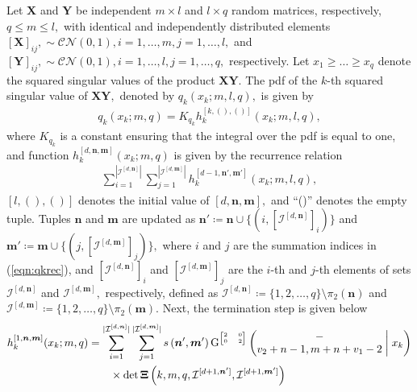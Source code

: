 \begin{theorem}
	\label{thm:qk}
	Let $\boldsymbol{X}$ and $\boldsymbol{Y}$ be independent $m\times l$ and $l\times q$ random matrices, respectively, $q \leq m \leq l,$ with identical and independently distributed elements $[\boldsymbol{X}]_{ij}, \sim \mathcal{CN}(0,1), i=1,\dots,m,j=1,\dots,l,$ and $[\boldsymbol{Y}]_{ij}, \sim \mathcal{CN}(0,1), i=1,\dots,l,j=1,\dots,q,$ respectively. Let $x_1 \geq \dots \geq x_q$ denote the squared singular values of the product $\boldsymbol{X}\boldsymbol{Y}.$ The pdf of the $k$-th squared singular value of $\boldsymbol{X}\boldsymbol{Y},$ denoted by $q_k(x_k; m, l, q),$ is given by
	\begin{align}
		q_k(x_k; m, q) = K_{q_k} h^{[k,(),()]}_k(x_k; m, l, q),
	\end{align}
	where $K_{q_k}$ is a constant ensuring that the integral over the pdf is equal to one, and function $h^{[d,\boldsymbol{n},\boldsymbol{m}]}_k(x_k; m, q)$ is given by the recurrence relation
	\begin{align}
		\sum_{i = 1}^{|{\mathcal{I}}^{[d,\boldsymbol{n}]}|} \sum_{j = 1}^{|{\mathcal{I}}^{[d,\boldsymbol{m}]}|} h^{[d-1,\boldsymbol{n}',\boldsymbol{m}']}_k(x_k; m,l,q), \label{eqn:qkrec}
	\end{align}
	$[l,(),()]$ denotes the initial value of $[d,\boldsymbol{n},\boldsymbol{m}],$ and ``()'' denotes the empty tuple. Tuples $\boldsymbol{n}$ and $\boldsymbol{m}$ are updated as $\boldsymbol{n}' \coloneqq \boldsymbol{n} \cup \{(i,[{\mathcal{I}}^{[d,\boldsymbol{n}]}]_i)\}$ and $\boldsymbol{m}' \coloneqq \boldsymbol{m} \cup \{(j,[{\mathcal{I}}^{[d,\boldsymbol{m}]}]_j)\},$ where $i$ and $j$ are the summation indices in (\ref{eqn:qkrec}), and $[{\mathcal{I}}^{[d,\boldsymbol{n}]}]_i$ and $[{\mathcal{I}}^{[d,\boldsymbol{m}]}]_j$ are the $i$-th and $j$-th elements of sets ${\mathcal{I}}^{[d, \boldsymbol{n}]}$ and ${\mathcal{I}}^{[d, \boldsymbol{m}]},$ respectively, defined as ${\mathcal{I}}^{[d,\boldsymbol{n}]} \coloneqq \{1,2,\dots,q\} \setminus \pi_2(\boldsymbol{n})$ and ${\mathcal{I}}^{[d,\boldsymbol{m}]} \coloneqq \{1,2,\dots,q\} \setminus \pi_2(\boldsymbol{m}).$ Next, the termination step is given below
		\begin{align}
			h^{[1,\boldsymbol{n},\boldsymbol{m}]}_k(x_k; m, q) &= \sum_{i = 1}^{|{\mathcal{I}}^{[d,\boldsymbol{n}]}|} \sum_{j = 1}^{|{\mathcal{I}}^{[d,\boldsymbol{m}]}|} s\left(\boldsymbol{n}',\boldsymbol{m}'\right)
			\G{2}{0}{0}{2}{-}{v_2+n-1, m+n+v_1-2}{x_k} \nonumber\\
			&\qquad \times \det{\boldsymbol{\Xi}\left(k, m, q, {\mathcal{I}}^{[d+1,\boldsymbol{n}']},{\mathcal{I}}^{[d+1,\boldsymbol{m}']}\right)} \nonumber\\

\end{align}
\end{theorem}
